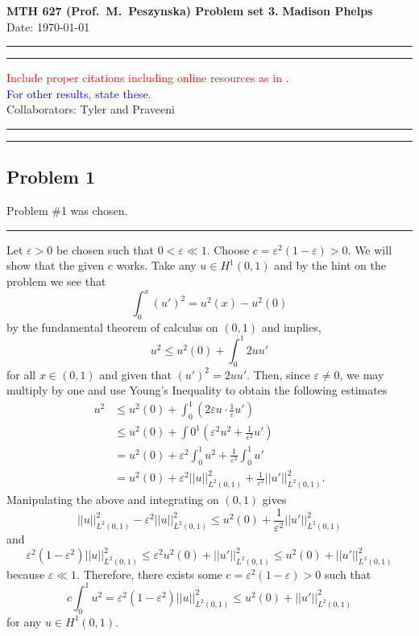 \documentclass[12pt]{amsart}
\begin{document}
\noindent
\textbf{MTH 627 (Prof.~M.~Peszynska) Problem set 3. } \hfill \textbf{Madison Phelps}\\
\hfill Date: \today\\
\medskip
\hrule
\hrule
\medskip
\noindent
\textcolor{red}{Include  proper citations including online resources as in  \cite[Chap.I, Theorem 1.1]{Showalter}. 
} 
\\
\textcolor{blue}{For other results, state these.}\\
Collaborators: Tyler and Praveeni\\

\medskip
\hrule
\hrule
\medskip
\subsection*{Problem 1}
Problem \#1 was chosen.
\medskip
\hrule
\medskip
%
 Let $\varepsilon > 0 $ be chosen such that $0 < \varepsilon \ll 1$. Choose $c = \varepsilon^2(1-\varepsilon) > 0$. We will show that the given $c$ works. Take any $u\in H^1(0,1)$ and by the hint on the problem we see that
 	\[ \int_0^x (u')^2 = u^2(x) - u^2(0) \]
by the fundamental theorem of calculus on $(0,1)$ and implies,
	\[ u^2  \leq u^2(0) + \int_0^1 2uu'\]
for all $x\in(0,1)$ and given that $(u')^2 = 2uu'$. Then, since $\varepsilon \neq 0$, we may multiply by one and use Young's Inequality to obtain the following estimates
	\begin{align*}
		u^2 & \leq u^2(0) + \int_0^1 \left(2\varepsilon u\cdot \frac{1}{\varepsilon} u'\right)\\
			& \leq u^2(0) + \int0^1 \left( \varepsilon^2 u^2 + \frac{1}{\varepsilon^2} u' \right)\\
			& = u^2(0) + \varepsilon^2 \int_0^1 u^2 + \frac{1}{\varepsilon^2}\int_0^1 u' \\
			& = u^2(0) + \varepsilon^2 || u ||_{L^2(0,1)}^2 + \frac{1}{\varepsilon^2} || u' ||_{L^2(0,1)}^2.
	\end{align*}
Manipulating the above and integrating on $(0,1)$ gives
	\[ || u ||_{L^2(0,1)}^2 - \varepsilon^2 || u ||_{L^2(0,1)}^2 \leq u^2(0) +  \frac{1}{\varepsilon^2} || u' ||_{L^2(0,1)}^2\]
and
\[ \varepsilon^2(1 - \varepsilon^2) || u ||_{L^2(0,1)}^2 \leq \varepsilon^2 u^2(0) +  || u' ||_{L^2(0,1)}^2 \leq  u^2(0) + || u' ||_{L^2(0,1)}^2\]
because $\varepsilon \ll 1$. Therefore, there exists some $ c = \varepsilon^2(1-\varepsilon) > 0$ such that 
	\[ c \int_0^1 u^2  = \varepsilon^2(1 - \varepsilon^2) || u ||_{L^2(0,1)}^2  \leq  u^2(0) + || u' ||_{L^2(0,1)}^2\]
for any $u\in H^1(0,1)$.
\end{document}
